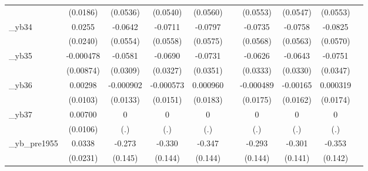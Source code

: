 \begin{table}[htbp]
\begin{tabular}{l*{9}{c}}
            &    (0.0186)         &    (0.0536)         &    (0.0540)         &    (0.0560)         &                     &    (0.0553)         &    (0.0547)         &    (0.0553)         &                     \\
[1em]
\_yb34       &      0.0255         &     -0.0642         &     -0.0711         &     -0.0797         &                     &     -0.0735         &     -0.0758         &     -0.0825         &                     \\
            &    (0.0240)         &    (0.0554)         &    (0.0558)         &    (0.0575)         &                     &    (0.0568)         &    (0.0563)         &    (0.0570)         &                     \\
[1em]
\_yb35       &   -0.000478         &     -0.0581\sym{*}  &     -0.0690\sym{**} &     -0.0731\sym{**} &                     &     -0.0626\sym{*}  &     -0.0643\sym{*}  &     -0.0751\sym{**} &                     \\
            &   (0.00874)         &    (0.0309)         &    (0.0327)         &    (0.0351)         &                     &    (0.0333)         &    (0.0330)         &    (0.0347)         &                     \\
[1em]
\_yb36       &     0.00298         &   -0.000902         &   -0.000573         &    0.000960         &                     &   -0.000489         &    -0.00165         &    0.000319         &                     \\
            &    (0.0103)         &    (0.0133)         &    (0.0151)         &    (0.0183)         &                     &    (0.0175)         &    (0.0162)         &    (0.0174)         &                     \\
[1em]
\_yb37       &     0.00700         &           0         &           0         &           0         &                     &           0         &           0         &           0         &                     \\
            &    (0.0106)         &         (.)         &         (.)         &         (.)         &                     &         (.)         &         (.)         &         (.)         &                     \\
[1em]
\_yb\_pre1955 &      0.0338         &      -0.273\sym{*}  &      -0.330\sym{**} &      -0.347\sym{**} &                     &      -0.293\sym{**} &      -0.301\sym{**} &      -0.353\sym{**} &                     \\
            &    (0.0231)         &     (0.145)         &     (0.144)         &     (0.144)         &                     &     (0.144)         &     (0.141)         &     (0.142)         &                     \\

\end{tabular}
\end{table}
